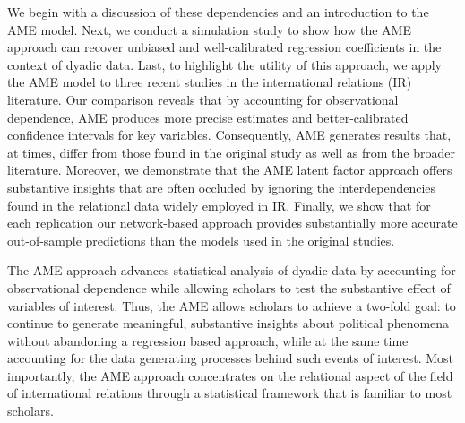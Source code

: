 We begin with a discussion of these dependencies and an introduction to the AME model. Next, we conduct a simulation study to show how the AME approach can recover unbiased and well-calibrated regression coefficients in the context of dyadic data. Last, to highlight the utility of this approach, we apply the AME model to three recent studies in the international relations (IR) literature. Our comparison reveals that by accounting for observational dependence, AME produces more precise estimates and better-calibrated confidence intervals for key variables. Consequently, AME generates results that, at times, differ from those found in the original study as well as from the broader literature. Moreover, we demonstrate that the AME latent factor approach offers substantive insights that are often occluded by ignoring the interdependencies found in the relational data widely employed in IR. Finally, we show that for each replication our network-based approach provides substantially more accurate out-of-sample predictions than the models used in the original studies.

The AME approach advances statistical analysis of dyadic data by accounting for observational dependence while allowing scholars to test the substantive effect of variables of interest. Thus, the AME allows scholars to achieve a two-fold goal: to continue to generate meaningful, substantive insights about political phenomena without abandoning a regression based approach, while at the same time accounting for the data generating processes behind such events of interest. Most importantly, the AME approach concentrates on the relational aspect of the field of international relations through a statistical framework that is familiar to most scholars.

